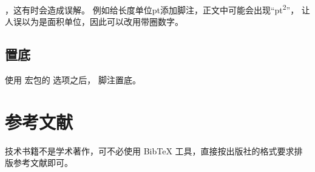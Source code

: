 ，这有时会造成误解。
例如给长度单位pt添加脚注，正文中可能会出现“pt\textsuperscript{2}”，
让人误以为是面积单位，因此可以改用带圈数字。

\subsection{置底}
\centerline{%
\quad{}}

使用  宏包的  选项之后，
脚注置底。\nopagebreak

\centerline{%
\quad{}}

\section{参考文献}
技术书籍不是学术著作，可不必使用 BibTeX 工具，直接按出版社的格式要求排版参考文献即可。

